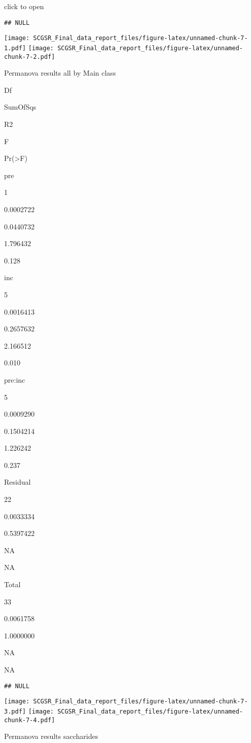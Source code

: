 \documentclass[
]{article}
\begin{document}
click to open

\begin{verbatim}
## NULL
\end{verbatim}

\texttt{[image: SCGSR\_Final\_data\_report\_files/figure-latex/unnamed-chunk-7-1.pdf]}
\texttt{[image: SCGSR\_Final\_data\_report\_files/figure-latex/unnamed-chunk-7-2.pdf]}

Permanova results all by Main class

Df

SumOfSqs

R2

F

Pr(\textgreater F)

pre

1

0.0002722

0.0440732

1.796432

0.128

inc

5

0.0016413

0.2657632

2.166512

0.010

pre:inc

5

0.0009290

0.1504214

1.226242

0.237

Residual

22

0.0033334

0.5397422

NA

NA

Total

33

0.0061758

1.0000000

NA

NA

\begin{verbatim}
## NULL
\end{verbatim}

\texttt{[image: SCGSR\_Final\_data\_report\_files/figure-latex/unnamed-chunk-7-3.pdf]}
\texttt{[image: SCGSR\_Final\_data\_report\_files/figure-latex/unnamed-chunk-7-4.pdf]}

Permanova results saccharides
\end{document}
